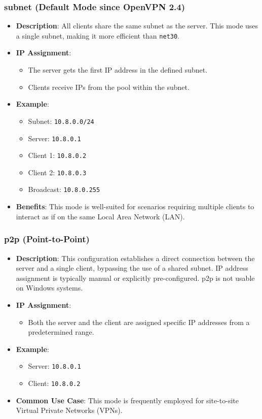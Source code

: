 \subsubsection{subnet (Default Mode since OpenVPN 2.4)}
\begin{itemize}
    \item \textbf{Description}: All clients share the same subnet as the server. This mode uses a single subnet, making it more efficient than \texttt{net30}.
\item \textbf{IP Assignment}:
\begin{itemize}
        \item The server gets the first IP address in the defined subnet.
        \item Clients receive IPs from the pool within the subnet.
\end{itemize}
\item \textbf{Example}:
\begin{itemize}
\item Subnet: \texttt{10.8.0.0/24}
\item Server: \texttt{10.8.0.1}
\item Client 1: \texttt{10.8.0.2}
\item Client 2: \texttt{10.8.0.3}
\item Broadcast: \texttt{10.8.0.255}
\end{itemize}
\item \textbf{Benefits}: This mode is well-suited for scenarios requiring multiple clients to interact as if on the same Local Area Network (LAN).
\end{itemize}

\subsubsection{p2p (Point-to-Point)}
\begin{itemize}
\item \textbf{Description}: This configuration establishes a direct connection between the server and a single client, bypassing the use of a shared subnet. IP address assignment is typically manual or explicitly pre-configured. p2p is not usable on Windows systems.
\item \textbf{IP Assignment}:
\begin{itemize}
\item Both the server and the client are assigned specific IP addresses from a predetermined range.
\end{itemize}
\item \textbf{Example}:
\begin{itemize}
\item Server: \texttt{10.8.0.1}
\item Client: \texttt{10.8.0.2}
\end{itemize}
\item \textbf{Common Use Case}: This mode is frequently employed for site-to-site Virtual Private Networks (VPNs).
\end{itemize}

